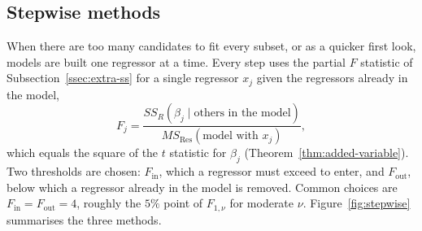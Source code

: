 \documentclass[11pt,a4paper]{article}
\numberwithin{equation}{section}
\theoremstyle{definition}
\begin{document}
\subsection{Stepwise methods}
When there are too many candidates to fit every subset, or as a quicker first look, models are
built one regressor at a time. Every step uses the partial $F$ statistic of
Subsection~\ref{ssec:extra-ss} for a single regressor $x_j$ given the regressors already in the model,
\[
F_j = \frac{SS_R(\beta_j \mid \text{others in the model})}{MS_{\mathrm{Res}}(\text{model with } x_j)} ,
\]
which equals the square of the $t$ statistic for $\beta_j$ (Theorem~\ref{thm:added-variable}). Two
thresholds are chosen: $F_{\mathrm{in}}$, which a regressor must exceed to enter, and $F_{\mathrm{out}}$,
below which a regressor already in the model is removed. Common choices are
$F_{\mathrm{in}} = F_{\mathrm{out}} = 4$, roughly the $5\%$ point of $F_{1,\nu}$ for moderate $\nu$.
Figure~\ref{fig:stepwise} summarises the three methods.
\end{document}
